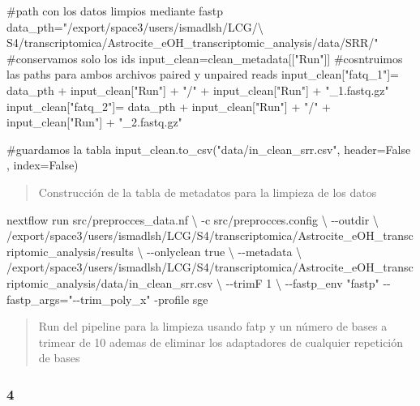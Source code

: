 \documentclass[
  9pt,
]{article}
\newenvironment{Shaded}{\begin{snugshade}}{\end{snugshade}}
\newcommand{\NormalTok}[1]{\textcolor[rgb]{0.00,0.23,0.31}{#1}}
\begin{document}
\begin{Shaded}
\begin{Highlighting}[]

\NormalTok{\#path con los datos limpios mediante fastp}
\NormalTok{data\_pth="/export/space3/users/ismadlsh/LCG/\textbackslash{}}
\NormalTok{S4/transcriptomica/Astrocite\_eOH\_transcriptomic\_analysis/data/SRR/"}
\NormalTok{\#conservamos solo los ids}
\NormalTok{input\_clean=clean\_metadata[["Run"]]}
\NormalTok{\#cosntruimos las paths para ambos archivos paired y unpaired reads}
\NormalTok{input\_clean["fatq\_1"]= data\_pth + input\_clean["Run"] + "/" + input\_clean["Run"] + "\_1.fastq.gz" }
\NormalTok{input\_clean["fatq\_2"]= data\_pth + input\_clean["Run"] + "/" + input\_clean["Run"] + "\_2.fastq.gz" }

\NormalTok{\#guardamos la tabla }
\NormalTok{input\_clean.to\_csv("data/in\_clean\_srr.csv", header=False , index=False)}
\end{Highlighting}
\end{Shaded}

\begin{quote}
Construcción de la tabla de metadatos para la limpieza de los datos
\end{quote}

\begin{Shaded}
\begin{Highlighting}[]
\NormalTok{nextflow run src/preprocces\_data.nf \textbackslash{}}
\NormalTok{{-}c src/preprocces.config \textbackslash{}}
\NormalTok{{-}{-}outdir \textbackslash{}}
\NormalTok{/export/space3/users/ismadlsh/LCG/S4/transcriptomica/Astrocite\_eOH\_transcriptomic\_analysis/results \textbackslash{}}
\NormalTok{{-}{-}onlyclean true \textbackslash{}}
\NormalTok{{-}{-}metadata \textbackslash{}}
\NormalTok{/export/space3/users/ismadlsh/LCG/S4/transcriptomica/Astrocite\_eOH\_transcriptomic\_analysis/data/in\_clean\_srr.csv \textbackslash{}}
\NormalTok{{-}{-}trimF 1 \textbackslash{}}
\NormalTok{{-}{-}fastp\_env "fastp" {-}{-}fastp\_args="{-}{-}trim\_poly\_x" {-}profile sge}
\end{Highlighting}
\end{Shaded}

\begin{quote}
Run del pipeline para la limpieza usando fatp y un número de bases a
trimear de 10 ademas de eliminar los adaptadores de cualquier repetición
de bases
\end{quote}

\subsubsection{4}\label{section-3}
\end{document}
